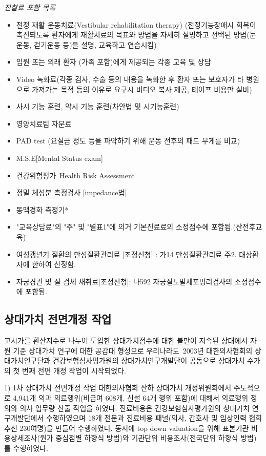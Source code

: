 \emph{진찰료 포함 목록}\par
\begin{itemize}\tightlist
\item 전정 재활 운동치료(Vestibular rehabilitation therapy)
   (전정기능장애시 회복이 촉진되도록 환자에게 재활치료의 목표와 방법을 자세히 설명하고 선택된 방법(눈운동, 걷기운동 등)을 설명, 교육하고 연습시킴) 
\item 입원 또는 외래 환자 (가족 포함)에게 제공되는 각종 교육 및 상담 
\item Video 녹화료(각종 검사, 수술 등의 내용을 녹화한 후 환자 또는 보호자가 타 병원으로 가져가는 목적 등의 이유로 요구시 비디오 복사 제공, 테이프 비용만 실비) 
\item 사시 기능 훈련, 약시 기능 훈련(차안법 및 시기능훈련) 
\item 영양치료팀 자문료 
\item PAD test (요실금 정도 등을 파악하기 위해 운동 전후의 패드 무게를 비교) 
\item M.S.E[Mental Status exam] 
\item 건강위험평가 Health Risk Assessment 
\item 정밀 체성분 측정검사 [impedance법] 
\item 동맥경화 측정기*
\item "교육상담료"의 "주" 및 "별표1"에 의거 기본진료료의 소정점수에 포함됨.(산전후교육)
\item 여성갱년기 질환의  만성질환관리료 [조정신청] :	가14 만성질환관리료 주2. 대상환자에 한하여 산정함.
\item 자궁경관 및 질 검체 채취료[조정신청]:	나592 자궁질도말세포병리검사의 소정점수에 포함됨.
\end{itemize}

\subsection{상대가치 전면개정 작업}
고시가를 환산지수로 나누어 도입한 상대가치점수에 대한 불만이 지속된 상태에서 자원 기준 상대가치 연구에 대한 공감대 형성으로 우리나라도 2003년 대한의사협회의 상대가치연구단과 건강보험심사평가원의 상대가치연구개발단이 공동으로 상대가치 수가의 첫 번째 전면 개정 작업이 시작되었다. 

1) 1차 상대가치 전면개정 작업 대한의사협회 산하 상대가치 개정위원회에서 주도적으로 4,941개 의과 의료행위(비급여 608개, 신설 64개 행위 포함)에 대해서 의료행위 정의와 의사 업무량 산출 작업을 하였다. 진료비용은 건강보험심사평가원의 상대가치 연구개발단에서 수행하였으며 18개 전문과 진료비용 패널(의사, 간호사 및 임상인력 협회 추천 230여명)을 만들어 수행하였다. 동시에 top down valuation을 위해 표본기관 비용상세조사(원가 중심점별 하향식 방법)와 기관단위 비용조사(전국단위 하향식 방법)를 수행하였다. 

